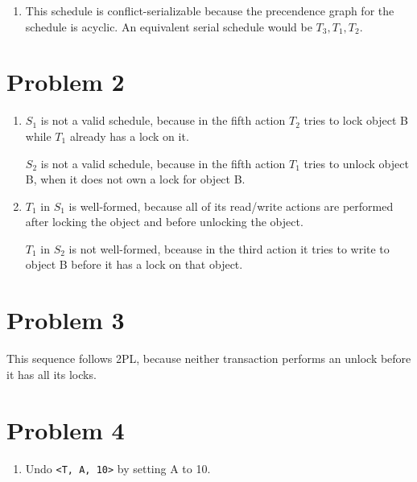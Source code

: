 \documentclass[a4paper, 12pt]{article}
\begin{document}
\begin{enumerate}[label=\textbf{S\arabic*:}]
\begin{enumerate}[label=Q\arabic*:]
			\item This schedule is conflict-serializable because the precendence
				graph for the schedule is acyclic. An equivalent serial schedule
				would be $T_3, T_1, T_2$.
		\end{enumerate}
\end{enumerate}

\section*{Problem 2}

\begin{enumerate}[label=Q\arabic*:]
	\item $S_1$ is not a valid schedule, because in the fifth action $T_2$ tries
		to lock object B while $T_1$ already has a lock on it.

		$S_2$ is not a valid schedule, because in the fifth action $T_1$ tries
		to unlock object B, when it does not own a lock for object B.
	\item $T_1$ in $S_1$ is well-formed, because all of its read/write actions
		are performed after locking the object and before unlocking the object.

		$T_1$ in $S_2$ is not well-formed, bceause in the third action it tries
		to write to object B before it has a lock on that object.
\end{enumerate}

\section*{Problem 3}

This sequence follows 2PL, because neither transaction performs an unlock before
it has all its locks.

\section*{Problem 4}

\begin{enumerate}[label=(\alph*)]
	\item Undo \texttt{<T, A, 10>} by setting A to 10.
\end{enumerate}
\end{document}

